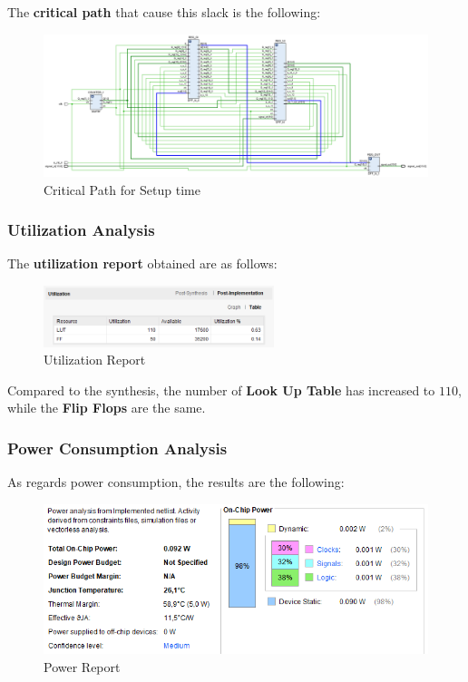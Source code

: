 The \textbf{critical path} that cause this slack is the following:

\begin{figure}[H]
    \centering
    \includegraphics[width=1\textwidth]{img/Chapter5/ImplementationSetupCrit.png}
    \caption{Critical Path for Setup time}
    \label{fig:ICPS}
\end{figure}

\subsubsection{Utilization Analysis}

The \textbf{utilization report} obtained are as follows:

\begin{figure}[H]
    \centering
    \includegraphics[width=0.6\textwidth]{img/Chapter5/ImplementationUtilization.png}
    \caption{Utilization Report}
    \label{fig:IU}
\end{figure}

Compared to the synthesis, the number of \textbf{Look Up Table} has increased to $110$, while the \textbf{Flip Flops} are the same.

\subsubsection{Power Consumption Analysis}

As regards power consumption, the results are the following:

\begin{figure}[H]
    \centering
    \includegraphics[width=1\textwidth]{img/Chapter5/ImplementationPower.png}
    \caption{Power Report}
    \label{fig:IPR}
\end{figure}

